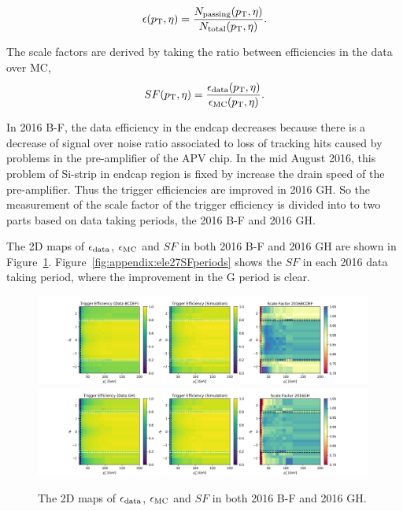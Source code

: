 \begin{equation}
    \epsilon (p_{\mathrm{T}}, \eta) = \frac{ N_{\rm passing} (p_{\mathrm{T}}, \eta) } {  N_{\rm total} (p_{\mathrm{T}}, \eta) }.
\end{equation}

\noindent The scale factors are derived by taking the ratio between efficiencies in the data over MC,
\begin{equation}
SF (p_{\mathrm{T}}, \eta) = \frac{\epsilon_{\rm{data}} (p_{\mathrm{T}}, \eta) }{\epsilon_{\rm{MC}} (p_{\mathrm{T}}, \eta) }.
\end{equation}




In 2016 B-F, the data efficiency in the endcap decreases because there is a decrease of signal over noise ratio associated to loss of tracking hits caused by problems in the pre-amplifier of the APV chip. In the mid August 2016, this problem of Si-strip in endcap region is fixed by increase the drain speed of the pre-amplifier. Thus the trigger efficiencies are improved in 2016 GH. So the measurement of the scale factor of the trigger efficiency is divided into to two parts based on data taking periods, the 2016 B-F and 2016 GH.


The 2D maps of $\epsilon_{\rm{data}}$, $\epsilon_{\rm{MC}}$ and $SF$ in both 2016 B-F and 2016 GH are shown in Figure~\ref{fig:appendix:ele27SF}. Figure~\ref{fig:appendix:ele27SFperiods} shows the $SF$ in each 2016 data taking period, where the improvement in the G period is clear.



\begin{figure}
    \centering
    \includegraphics[width=0.99\textwidth]{chapters/Analysis/sectionCalibration/figures/eTrigger/eff2d_BCDEF.png}
    \includegraphics[width=0.99\textwidth]{chapters/Analysis/sectionCalibration/figures/eTrigger/eff2d_GH.png}
    \caption{The 2D maps of $\epsilon_{\rm{data}}$, $\epsilon_{\rm{MC}}$ and $SF$ in both 2016 B-F and 2016 GH.}
    \label{fig:appendix:ele27SF}
\end{figure}



